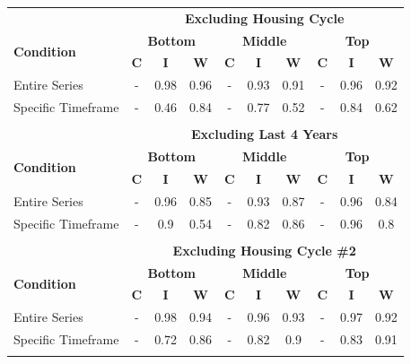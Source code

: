 \begin{table}[h!]
\centering
\begin{tabular}{l c c c c c c c c c}
\toprule\toprule
&\multicolumn{9}{c}{\textbf{Excluding Housing Cycle}} \vspace{2mm}\\
\multirow{2}{*}{\textbf{Condition}} & \multicolumn{3}{c}{\textbf{Bottom}} & \multicolumn{3}{c}{\textbf{Middle}} & \multicolumn{3}{c}{\textbf{Top}} \\
& \textbf{C}& \textbf{I}& \textbf{W}& \textbf{C}& \textbf{I}& \textbf{W}& \textbf{C}& \textbf{I}& \textbf{W} \\
Entire Series & - & 0.98 & 0.96 & - & 0.93 & 0.91 & - & 0.96 & 0.92 \\
Specific Timeframe & - & 0.46 & 0.84 & - & 0.77 & 0.52 & - & 0.84 & 0.62 \\
\vspace{2mm}\\
&\multicolumn{9}{c}{\textbf{Excluding Last 4 Years}} \vspace{2mm}\\
\multirow{2}{*}{\textbf{Condition}} & \multicolumn{3}{c}{\textbf{Bottom}} & \multicolumn{3}{c}{\textbf{Middle}} & \multicolumn{3}{c}{\textbf{Top}} \\
& \textbf{C}& \textbf{I}& \textbf{W}& \textbf{C}& \textbf{I}& \textbf{W}& \textbf{C}& \textbf{I}& \textbf{W} \\
Entire Series & - & 0.96 & 0.85 & - & 0.93 & 0.87 & - & 0.96 & 0.84 \\
Specific Timeframe & - & 0.9 & 0.54 & - & 0.82 & 0.86 & - & 0.96 & 0.8 \\
\vspace{2mm}\\
&\multicolumn{9}{c}{\textbf{Excluding Housing Cycle \#2}} \vspace{2mm}\\
\multirow{2}{*}{\textbf{Condition}} & \multicolumn{3}{c}{\textbf{Bottom}} & \multicolumn{3}{c}{\textbf{Middle}} & \multicolumn{3}{c}{\textbf{Top}} \\
& \textbf{C}& \textbf{I}& \textbf{W}& \textbf{C}& \textbf{I}& \textbf{W}& \textbf{C}& \textbf{I}& \textbf{W} \\
Entire Series & - & 0.98 & 0.94 & - & 0.96 & 0.93 & - & 0.97 & 0.92 \\
Specific Timeframe & - & 0.72 & 0.86 & - & 0.82 & 0.9 & - & 0.83 & 0.91 \\
\vspace{2mm}\\

\end{tabular}
\end{table}
